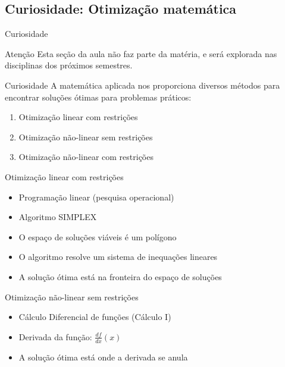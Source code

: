 \documentclass{beamer}
\begin{document}
\begin{frame}

\end{frame}

\subsection[Curiosidade]{Curiosidade: Otimização matemática}

\begin{frame}{Curiosidade}
  \begin{block}{Atenção}
    Esta seção da aula não faz parte da matéria, e será explorada nas disciplinas dos próximos semestres.
  \end{block}
\end{frame}

\begin{frame}{Curiosidade}
A matemática aplicada nos proporciona diversos métodos para encontrar soluções ótimas para problemas práticos:

  \begin{enumerate}
  \item<2-> Otimização linear com restrições
  \item<3-> Otimização não-linear sem restrições
  \item<4-> Otimização não-linear com restrições
  \end{enumerate}
\end{frame}

\begin{frame}{Otimização linear com restrições}
  \begin{itemize}
  \item Programação linear (pesquisa operacional)
  \item Algoritmo SIMPLEX
  \item O espaço de soluções viáveis é um polígono
  \item O algoritmo resolve um sistema de inequações lineares
  \item A solução ótima está na fronteira do espaço de soluções
  \end{itemize}
\end{frame}

\begin{frame}{Otimização não-linear sem restrições}
  \begin{itemize}
  \item Cálculo Diferencial de funções (Cálculo I)
  \item Derivada da função: $\frac{d f}{d x}(x)$
  \item A solução ótima está onde a derivada se anula
  \end{itemize}
\end{frame}
\end{document}
